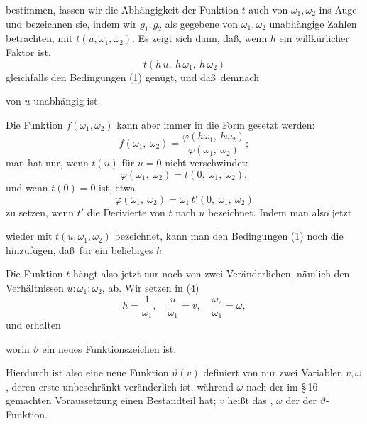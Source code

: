 bestimmen, fassen wir die Abh\"angigkeit der Funktion $t$ auch
von $\omega_1, \omega_2$ ins Auge und bezeichnen sie, indem wir $g_1, g_2$ als
gegebene von $\omega_1, \omega_2$ unabh\"angige Zahlen betrachten, mit
$t(u, \omega_1, \omega_2)$. Es zeigt sich dann, da\ss, wenn $h$ ein willk\"urlicher
Faktor ist,
\[
t(h\,u,\ h\,\omega_1,\ h\,\omega_2)
\]
gleichfalls den Bedingungen (1) gen\"ugt, und da\ss\ demnach


von $u$ unabh\"angig ist.

Die Funktion $f(\omega_1, \omega_2)$ kann aber immer in die Form gesetzt
 werden:
\[
f(\omega_1,\ \omega_2) = \frac{\varphi(h\omega_1,\ h\omega_2)}{\varphi(\omega_1,\ \omega_2)};
\]
man hat nur, wenn $t(u)$ f\"ur $u = 0$ nicht verschwindet:
\[
\varphi(\omega_1,\ \omega_2) = t(0,\ \omega_1,\ \omega_2),
\]
und wenn $t(0) = 0$ ist, etwa
\[
\varphi(\omega_1,\ \omega_2) = \omega_1\, t'(0,\ \omega_1,\ \omega_2)
\]
zu setzen, wenn $t'$ die Derivierte von $t$ nach $u$ bezeichnet. Indem
man also jetzt


wieder mit $t(u, \omega_1, \omega_2)$ bezeichnet, kann man den Bedingungen (1)
noch die hinzuf\"ugen, da\ss\ f\"ur ein beliebiges $h$


Die Funktion $t$ h\"angt also jetzt nur noch von zwei Ver\"anderlichen, n\"amlich den Verh\"altnissen $u : \omega_1 : \omega_2$, ab. Wir setzen in (4)
\[
h = \frac{1}{\omega_1},\quad \frac{u}{\omega_1} = v,\quad \frac{\omega_2}{\omega_1} = \omega,
\]
und erhalten


worin $\vartheta$ ein neues Funktionszeichen ist.

Hierdurch ist also eine neue Funktion $\vartheta(v)$ definiert von nur
zwei Variablen $v, \omega$, deren erste unbeschr\"ankt ver\"anderlich ist,
w\"ahrend $\omega$ nach der im \S\,16 gemachten Voraussetzung einen
 Bestandteil hat; $v$ hei\ss t das ,
$\omega$ der  der $\vartheta$-Funktion.
